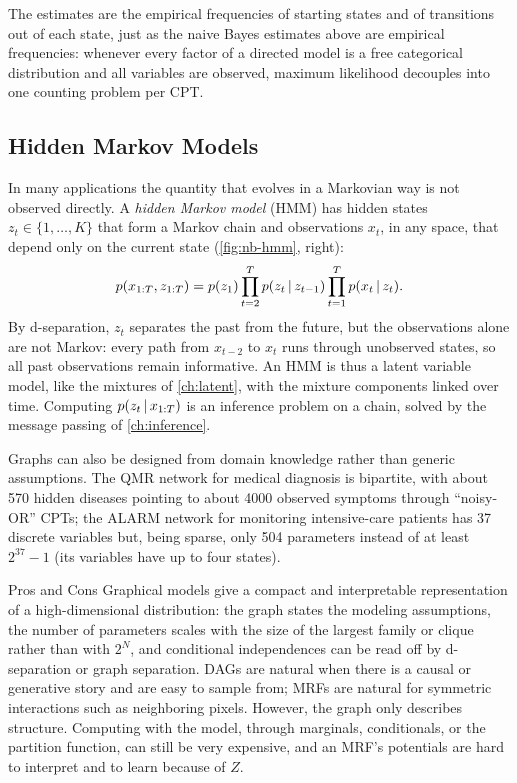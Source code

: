 The estimates are the empirical frequencies of starting states and of transitions out of each state, just as the naive Bayes estimates above are empirical frequencies: whenever every factor of a directed model is a free categorical distribution and all variables are observed, maximum likelihood decouples into one counting problem per CPT.

\subsection{Hidden Markov Models}\label{sec:hmm}

In many applications the quantity that evolves in a Markovian way is not observed directly. A \emph{hidden Markov model} (HMM) has hidden states $z_t\in\{1,\dots,K\}$ that form a Markov chain and observations $x_t$, in any space, that depend only on the current state (\cref{fig:nb-hmm}, right):
\[
p(x_{1:T},z_{1:T})=p(z_1)\prod_{t=2}^Tp(z_t\,|\, z_{t-1})\prod_{t=1}^Tp(x_t\,|\, z_t).
\]
By d-separation, $z_t$ separates the past from the future, but the observations alone are not Markov: every path from $x_{t-2}$ to $x_t$ runs through unobserved states, so all past observations remain informative. An HMM is thus a latent variable model, like the mixtures of \cref{ch:latent}, with the mixture components linked over time. Computing $p(z_t\,|\, x_{1:T})$ is an inference problem on a chain, solved by the message passing of \cref{ch:inference}.

Graphs can also be designed from domain knowledge rather than generic assumptions. The QMR network for medical diagnosis is bipartite, with about 570 hidden diseases pointing to about 4000 observed symptoms through ``noisy-OR'' CPTs; the ALARM network for monitoring intensive-care patients has 37 discrete variables but, being sparse, only 504 parameters instead of at least $2^{37}-1$ (its variables have up to four states).

\begin{notebox}{Pros and Cons}
Graphical models give a compact and interpretable representation of a high-dimensional distribution: the graph states the modeling assumptions, the number of parameters scales with the size of the largest family or clique rather than with $2^N$, and conditional independences can be read off by d-separation or graph separation. DAGs are natural when there is a causal or generative story and are easy to sample from; MRFs are natural for symmetric interactions such as neighboring pixels. However, the graph only describes structure. Computing with the model, through marginals, conditionals, or the partition function, can still be very expensive, and an MRF's potentials are hard to interpret and to learn because of $Z$.
\end{notebox}

